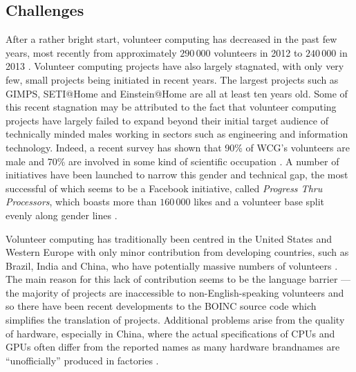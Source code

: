 \subsection{Challenges} \label{Bchallenges}
After a rather bright start, volunteer computing has decreased in the past few years, most recently from approximately $290\,000$ volunteers in 2012 to $240\,000$ in 2013 \cite{anderson2013}. Volunteer computing projects have also largely stagnated, with only very few, small projects being initiated in recent years. The largest projects such as GIMPS, SETI@Home and Einstein@Home are all at least ten years old. Some of this recent stagnation may be attributed to the fact that volunteer computing projects have largely failed to expand beyond their initial target audience of technically minded males working in sectors such as engineering and information technology. Indeed, a recent survey has shown that 90\% of WCG's volunteers are male and 70\% are involved in some kind of scientific occupation \cite{wcg2013}. A number of initiatives have been launched to narrow  this gender and technical gap, the most successful of which seems to be a Facebook \cite{facebook} initiative, called \emph{Progress Thru Processors},  which boasts more than $160\,000$ likes and a volunteer base  split evenly along gender lines \cite{ptp2013}.

Volunteer computing has traditionally been centred in the United States and Western Europe with only minor contribution  from developing countries, such as Brazil, India and China, who have potentially massive numbers of volunteers \cite{wcg2013}. The main reason for this lack of contribution seems to be the language barrier --- the majority of projects are inaccessible to non-English-speaking volunteers \cite{china2013} and so there have been recent developments to the BOINC source code which simplifies the translation of projects. Additional problems arise from the quality of hardware, especially in China, where the actual specifications of CPUs and GPUs often differ from the reported names as many hardware brandnames are ``unofficially'' produced in factories \cite{keith}. 

